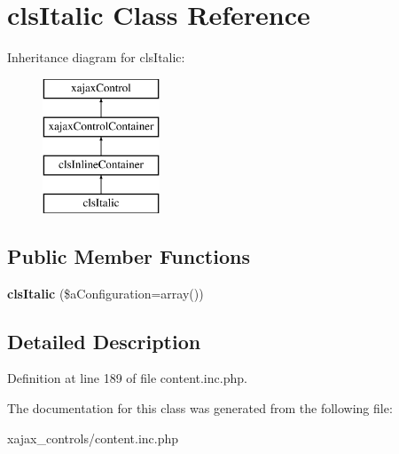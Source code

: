 \hypertarget{classclsItalic}{
\section{clsItalic Class Reference}
\label{classclsItalic}
}
Inheritance diagram for clsItalic:\begin{figure}[H]
\begin{center}
\leavevmode
\includegraphics[height=4.000000cm]{classclsItalic}
\end{center}
\end{figure}
\subsection*{Public Member Functions}
\begin{DoxyCompactItemize}
\item 
\hypertarget{classclsItalic_a215a2a4beb43d0b65361bdad656acad5}{
{\bfseries clsItalic} (\$aConfiguration=array())}
\label{classclsItalic_a215a2a4beb43d0b65361bdad656acad5}

\end{DoxyCompactItemize}


\subsection{Detailed Description}


Definition at line 189 of file content.inc.php.



The documentation for this class was generated from the following file:\begin{DoxyCompactItemize}
\item 
xajax\_\-controls/content.inc.php\end{DoxyCompactItemize}

